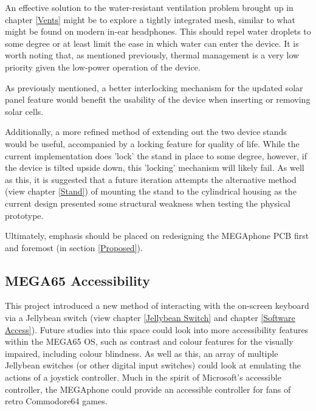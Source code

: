 An effective solution to the water-resistant ventilation problem brought up in chapter \ref{Vents} might be to explore a tightly integrated mesh, similar to what might be found on modern in-ear headphones.
This should repel water droplets to some degree or at least limit the ease in which water can enter the device.
It is worth noting that, as mentioned previously, thermal management is a very low priority given the low-power operation of the device.

As previously mentioned, a better interlocking mechanism for the updated solar panel feature would benefit the usability of the device when inserting or removing solar cells.

Additionally, a more refined method of extending out the two device stands would be useful, accompanied by a locking feature for quality of life.
While the current implementation does 'lock' the stand in place to some degree, however, if the device is tilted upside down, this 'locking' mechanism will likely fail.
As well as this, it is suggested that a future iteration attempts the alternative method (view chapter \ref{Stand}) of mounting the stand to the cylindrical housing as the current design presented some structural weakness when testing the physical prototype.

Ultimately, emphasis should be placed on redesigning the MEGAphone PCB first and foremost (in section \ref{Proposed}).

\subsection{MEGA65 Accessibility}

This project introduced a new method of interacting with the on-screen keyboard via a Jellybean switch (view chapter \ref{Jellybean Switch} and chapter \ref{Software Access}).
Future studies into this space could look into more accessibility features within the MEGA65 OS, such as contrast and colour features for the visually impaired, including colour blindness.
As well as this, an array of multiple Jellybean switches (or other digital input switches) could look at emulating the actions of a joystick controller.
Much in the spirit of Microsoft's accessible controller, the MEGAphone could provide an accessible controller for fans of retro Commodore64 games.


